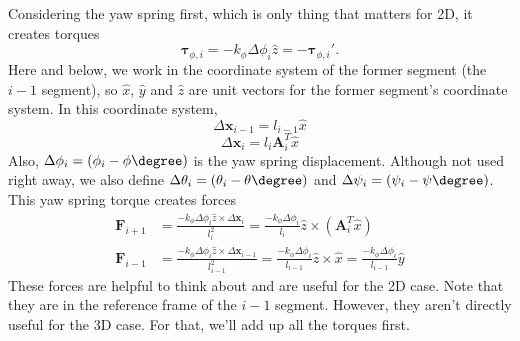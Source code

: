 \documentclass {scrbook}
\begin{document}
Considering the yaw spring first, which is only thing that matters for 2D, it creates torques
\begin{equation}
\bm{\tau}_{\phi,i} = - k_\phi \Delta \phi_i \hat{z} = -\bm{\tau}_{\phi,i}'.
\label{eq:YawTorque}
\end{equation}
Here and below, we work in the coordinate system of the former segment (the $i-1$ segment), so $\hat{x}$, $\hat{y}$ and $\hat{z}$ are unit vectors for the former segment's coordinate system. In this coordinate system,
$$\Delta \bm{x}_{i-1} = l_{i-1} \hat{x}$$
$$\Delta \bm{x}_{i} = l_i \bm{A}_i^T \hat{x}$$
Also, $\Delta \phi_i = (\phi_i-\phi \degree)$ is the yaw spring displacement. Although not used right away, we also define $\Delta \theta_i = (\theta_i-\theta \degree)$ and $\Delta \psi_i = (\psi_i-\psi \degree)$. This yaw spring torque creates forces
\begin{align}
\bm{F}_{i+1} &= \frac{- k_\phi \Delta \phi_i \hat{z} \times \Delta \bm{x}_i}{l_i^2}
= \frac{- k_\phi \Delta \phi_i}{l_i} \hat{z} \times (\bm{A}_i^T \hat{x}) \nonumber \\
\label{eq:BendForce2D}
\bm{F}_{i-1} &= \frac{- k_\phi \Delta \phi_i \hat{z} \times \Delta \bm{x}_{i-1}}{l_{i-1}^2}
= \frac{- k_\phi \Delta \phi_i}{l_{i-1}}\hat{z} \times \hat{x}
= \frac{- k_\phi \Delta \phi_i}{l_{i-1}}\hat{y}
\end{align}
These forces are helpful to think about and are useful for the 2D case. Note that they are in the reference frame of the $i-1$ segment. However, they aren't directly useful for the 3D case. For that, we'll add up all the torques first.
\end{document}
